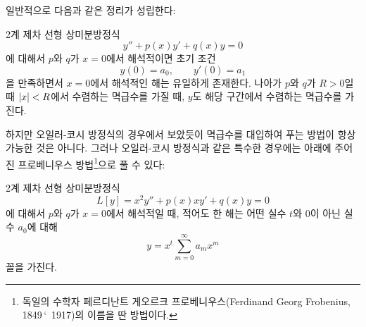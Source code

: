 \documentclass[../engineering_mathematics_lecture_note.tex]{subfiles}
\begin{document}
일반적으로 다음과 같은 정리가 성립한다:
\begin{theorem}
    2계 제차 선형 상미분방정식
    \begin{equation*}
        y'' + p(x) y' + q(x) y = 0
    \end{equation*}
    에 대해서 $p$와 $q$가 $x = 0$에서 해석적이면 초기 조건
    \begin{equation*}
        y(0) = a_0, \qquad y'(0) = a_1
    \end{equation*}
    을 만족하면서 $x = 0$에서 해석적인 해는 유일하게 존재한다.
    나아가 $p$와 $q$가 $R > 0$일 때 $\abs{x} < R$에서 수렴하는 멱급수를 가질 때, $y$도 해당 구간에서 수렴하는 멱급수를 가진다.
\end{theorem}

하지만 오일러-코시 방정식의 경우에서 보았듯이 멱급수를 대입하여 푸는 방법이 항상 가능한 것은 아니다.
그러나 오일러-코시 방정식과 같은 특수한 경우에는 아래에 주어진 프로베니우스 방법\footnote{독일의 수학자 페르디난트 게오르크 프로베니우스(Ferdinand Georg Frobenius, 1849\,\char`~1917)의 이름을 딴 방법이다.}으로 풀 수 있다:
\begin{theorem} 
    2계 제차 선형 상미분방정식
    \begin{equation} \label{eq:frobenius}
        L[y] = x^2y''+ p(x) x y' + q(x) y = 0
    \end{equation}
    에 대해서 $p$와 $q$가 $x = 0$에서 해석적일 때, 적어도 한 해는 어떤 실수 $t$와 0이 아닌 실수 $a_0$에 대해
    \begin{equation} \label{eq:frobenius_power}
        y = x^t \sum^{\infty}_{m = 0} a_m x^m
    \end{equation}
    꼴을 가진다.
\end{theorem}
\end{document}

